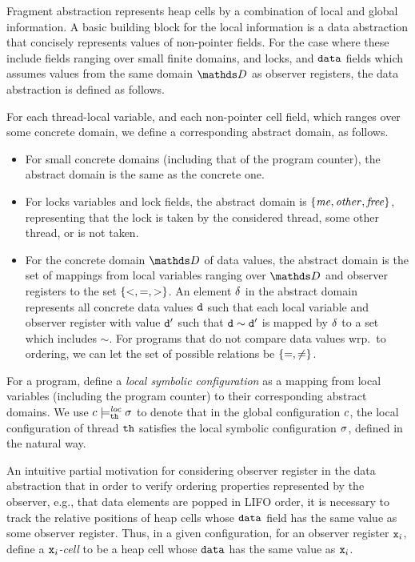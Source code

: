Fragment abstraction represents heap cells by a combination of local and
global information. A basic building block for the local information
is a data abstraction that concisely represents values of non-pointer fields.
For the case where these include fields ranging over small
finite domains, and locks, and $\tt data$ fields which
assumes values from the same domain $\ddomain$ as observer registers,
the data abstraction is defined as follows.

For each thread-local variable, and each non-pointer cell field, which ranges
over some concrete domain, we define a corresponding abstract domain,
as follows.
\begin{itemize}
\item For small concrete domains (including that of the program counter),
  the abstract domain is the same as the concrete one.
\item
  For locks variables and lock fields, the abstract domain is $\left\{\mathit{me},\mathit{other},\mathit{free}\right\}$, representing that the lock is taken by the
  considered thread, some other thread, or is not taken.
\item For the concrete domain $\ddomain$ of data values, the abstract domain
  is the set of mappings from local variables ranging over $\ddomain$ and
  observer registers to the set $\left\{<,=,>\right\}$.
  An element $\delta$ in the abstract domain represents all concrete data values $\tt d$ such that each local variable and observer register with value $\tt d'$
  such that  $\tt d \sim \tt d'$ is  mapped by $\delta$ to a set which includes $\sim$. For programs that do not compare data values wrp.\ to ordering,
  we can let the set of possible relations be $\left\{=,\neq\right\}$.
\end{itemize}
For a program,
define a {\em local symbolic configuration} as a mapping from local
variables (including the program counter) to their corresponding abstract
domains.
We use $c \models_{{\tt th}}^{\mathit{loc}} \sigma$ to denote that in the
global configuration $c$, the
local configuration of thread ${\tt th}$ satisfies the local symbolic
configuration $\sigma$, defined in the natural way.

An intuitive partial motivation for considering observer register
in the data abstraction that
in order to verify ordering properties represented by the
observer, e.g., that data elements are popped in LIFO order, it is necessary to
track the relative positions of heap cells whose ${\tt data}$ field has the same
value as some observer register. Thus,   in a given configuration,
for an observer register $\mathtt{x}_i$,  define a
{\em $\mathtt{x}_i$-cell} to be a heap cell whose
${\tt data}$ has the same value as $\mathtt{x}_i$.

